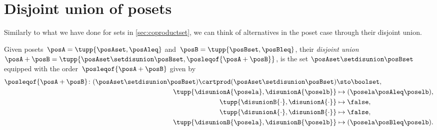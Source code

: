 
\section{Disjoint union of posets}
Similarly to what we have done for sets in \cref{sec:coproductset}, we can think of alternatives in the poset case through their disjoint union.

\begin{definition}
    Given posets~$\posA=\tupp{\posAset, \posAleq}$ and~$\posB=\tupp{\posBset, \posBleq}$, their \emph{disjoint union}~$\posA+\posB=\tupp{\posAset \setdisunion \posBset, \posleqof{\posA + \posB}}$, is the set $\posAset \setdisunion \posBset$ equipped with the order~$\posleqof{\posA + \posB}$ given by
    \begin{equation*}
        \begin{aligned}
            \posleqof{\posA+\posB}\colon
            (\posAset\setdisunion\posBset)\cartprod (\posAset
            \setdisunion\posBset)                           & \sto \boolset, \\
            \tupp{\disunionA{\posela},\disunionA{\poselb} } &
            \mapsto (\posela\posAleq \poselb), \\
            \tupp{\disunionB{\cdot},\disunionA{\cdot} }     &
            \mapsto \false, \\
            \tupp{\disunionA{\cdot},\disunionB{\cdot}}      &
            \mapsto \false, \\
            \tupp{\disunionB{\posela},\disunionB{\poselb}}  &
            \mapsto (\posela\posBleq \poselb).
        \end{aligned}
    \end{equation*}
\end{definition}

